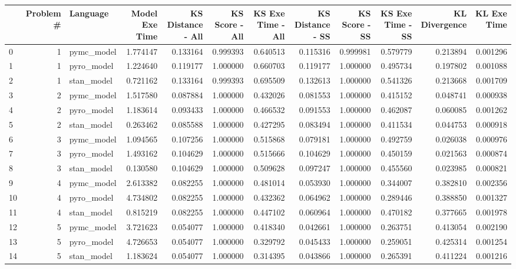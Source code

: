 \begin{tabular}{lrlrrrrrrrrr}
\toprule
 & Problem # & Language & Model Exe Time & KS Distance - All & KS Score - All & KS Exe Time - All & KS Distance - SS & KS Score - SS & KS Exe Time - SS & KL Divergence & KL Exe Time \\
\midrule
0 & 1 & pymc_model & 1.774147 & 0.133164 & 0.999393 & 0.640513 & 0.115316 & 0.999981 & 0.579779 & 0.213894 & 0.001296 \\
1 & 1 & pyro_model & 1.224640 & 0.119177 & 1.000000 & 0.660703 & 0.119177 & 1.000000 & 0.495734 & 0.197802 & 0.001088 \\
2 & 1 & stan_model & 0.721162 & 0.133164 & 0.999393 & 0.695509 & 0.132613 & 1.000000 & 0.541326 & 0.213668 & 0.001709 \\
3 & 2 & pymc_model & 1.517580 & 0.087884 & 1.000000 & 0.432026 & 0.081553 & 1.000000 & 0.415152 & 0.048741 & 0.000938 \\
4 & 2 & pyro_model & 1.183614 & 0.093433 & 1.000000 & 0.466532 & 0.091553 & 1.000000 & 0.462087 & 0.060085 & 0.001262 \\
5 & 2 & stan_model & 0.263462 & 0.085588 & 1.000000 & 0.427295 & 0.083494 & 1.000000 & 0.411534 & 0.044753 & 0.000918 \\
6 & 3 & pymc_model & 1.094565 & 0.107256 & 1.000000 & 0.515868 & 0.079181 & 1.000000 & 0.492759 & 0.026038 & 0.000976 \\
7 & 3 & pyro_model & 1.493162 & 0.104629 & 1.000000 & 0.515666 & 0.104629 & 1.000000 & 0.450159 & 0.021563 & 0.000874 \\
8 & 3 & stan_model & 0.130580 & 0.104629 & 1.000000 & 0.509628 & 0.097247 & 1.000000 & 0.455560 & 0.023985 & 0.000821 \\
9 & 4 & pymc_model & 2.613382 & 0.082255 & 1.000000 & 0.481014 & 0.053930 & 1.000000 & 0.344007 & 0.382810 & 0.002356 \\
10 & 4 & pyro_model & 4.734802 & 0.082255 & 1.000000 & 0.432362 & 0.064962 & 1.000000 & 0.289446 & 0.388850 & 0.001327 \\
11 & 4 & stan_model & 0.815219 & 0.082255 & 1.000000 & 0.447102 & 0.060964 & 1.000000 & 0.470182 & 0.377665 & 0.001978 \\
12 & 5 & pymc_model & 3.721623 & 0.054077 & 1.000000 & 0.418340 & 0.042661 & 1.000000 & 0.263751 & 0.413054 & 0.002190 \\
13 & 5 & pyro_model & 4.726653 & 0.054077 & 1.000000 & 0.329792 & 0.045433 & 1.000000 & 0.259051 & 0.425314 & 0.001254 \\
14 & 5 & stan_model & 1.183624 & 0.054077 & 1.000000 & 0.314395 & 0.043866 & 1.000000 & 0.265391 & 0.411224 & 0.001216 \\

\end{tabular}
